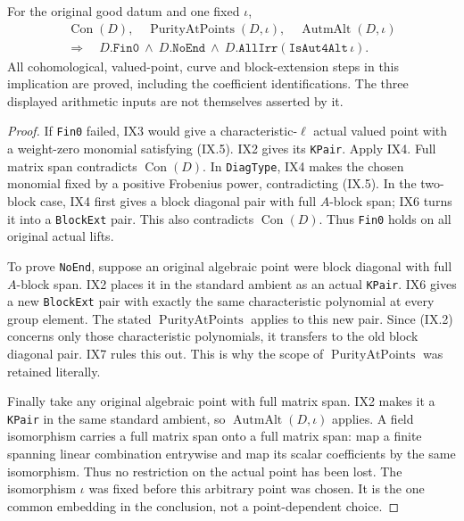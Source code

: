 
\begin{theorem}
\label{claim:IX8}
For the original good datum and one fixed $\iota$,
\[
 \begin{gathered}
 \operatorname{Con}(D),\quad
 \operatorname{PurityAtPoints}(D,\iota),\quad
 \operatorname{AutmAlt}(D,\iota)\\
 \Longrightarrow\quad
 D.\texttt{Fin0}\ \land\ D.\texttt{NoEnd}\ \land\
 D.\texttt{AllIrr}(\texttt{IsAut4Alt}\,\iota).
 \end{gathered}
 \tag{IX.25}
\]
All cohomological, valued-point, curve and block-extension
steps in this implication are proved, including the
coefficient identifications.  The three displayed arithmetic inputs
are not themselves asserted by it.
\end{theorem}

\begin{proof}
If \texttt{Fin0} failed, IX3 would give a characteristic-$\ell$
actual valued point with a weight-zero monomial satisfying
(IX.5).  IX2 gives its \texttt{KPair}.
Apply IX4.  Full matrix span contradicts
$\operatorname{Con}(D)$.  In \texttt{DiagType}, IX4 makes
the chosen monomial fixed by a positive Frobenius power,
contradicting (IX.5).  In the two-block case, IX4 first
gives a block diagonal pair with full $A$-block span;
IX6 turns it into a \texttt{BlockExt} pair.  This also
contradicts $\operatorname{Con}(D)$.
Thus \texttt{Fin0} holds on all original actual lifts.

To prove \texttt{NoEnd}, suppose an original algebraic
point were block diagonal with full $A$-block span.
IX2 places it in the standard ambient as an actual
\texttt{KPair}.  IX6 gives a new \texttt{BlockExt} pair
with exactly the same characteristic polynomial at
every group element.  The stated
$\operatorname{PurityAtPoints}$ applies to this new pair.
Since (IX.2) concerns only those characteristic
polynomials, it transfers to the old block diagonal
pair.  IX7 rules this out.  This is why the scope of
$\operatorname{PurityAtPoints}$ was retained literally.

Finally take any original algebraic point with full
matrix span.  IX2 makes it a \texttt{KPair} in the same
standard ambient, so $\operatorname{AutmAlt}(D,\iota)$
applies.  A field isomorphism carries a full matrix
span onto a full matrix span: map a finite spanning
linear combination entrywise and map its scalar
coefficients by the same isomorphism.
Thus no restriction on the actual point has been lost.
The isomorphism $\iota$ was fixed before this arbitrary
point was chosen.  It is the one common embedding in
the conclusion, not a point-dependent choice.
\end{proof}

